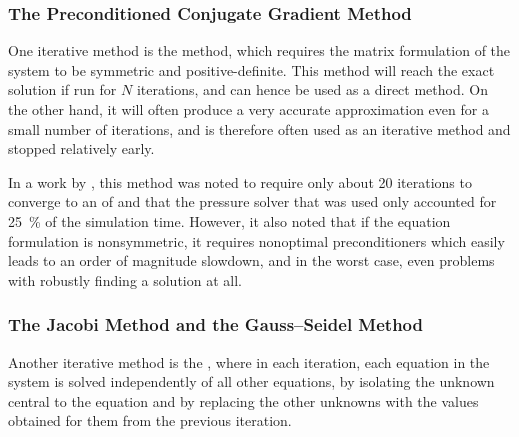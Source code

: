 \subsubsection{The Preconditioned Conjugate Gradient Method}


One iterative method is the \PCG method, which requires the matrix formulation of the system to be symmetric and positive-definite. This method will reach the exact solution if run for $N$ iterations, and can hence be used as a direct method. On the other hand, it will often produce a very accurate approximation even for a small number of iterations, and is therefore often used as an iterative method and stopped relatively early.

In a work by \citet{Losasso2004}, this method was noted to require only about 20 iterations to converge to an \accuracy of  and that the pressure solver that was used only accounted for \mbox{25 \%} of the simulation time. However, it also noted that if the equation formulation is nonsymmetric, it requires nonoptimal preconditioners which easily leads to an order of magnitude slowdown, and in the worst case, even problems with robustly finding a solution at all.

\subsubsection{The Jacobi Method and the Gauss--Seidel Method}

Another iterative method is the , where in each iteration, each equation in the system is solved independently of all other equations, by isolating the unknown central to the equation and by replacing the other unknowns with the values obtained for them from the previous iteration.

